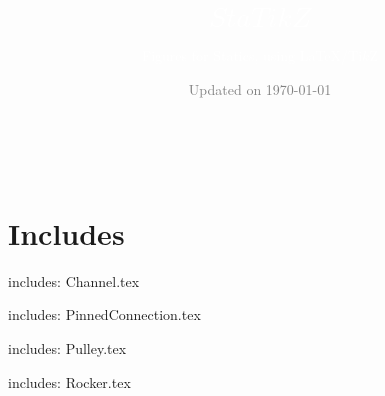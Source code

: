 \documentclass[9pt,xcolor={svgnames, x11names}]{beamer}
\title[statikz]{\Huge \textcolor{white}{$Sta$\textcolor{saitRed!50!white}{$TikZ$}}}
\subtitle[]{\Large\textcolor{white}{Figures for Statics, using \LaTeX{}/Ti$k$Z}}
\date{\small \textcolor{gray}{Updated on \today}}
\begin{document}
\centering

\begin{frame}[plain]
	\titlepage\
\end{frame}

\section{Includes}

\begin{frame}{includes: Channel.tex}

\end{frame}



\begin{frame}{includes: PinnedConnection.tex}

\end{frame}

\begin{frame}{includes: Pulley.tex}


\end{frame}

\begin{frame}{includes: Rocker.tex}


\end{frame}
\end{document}
